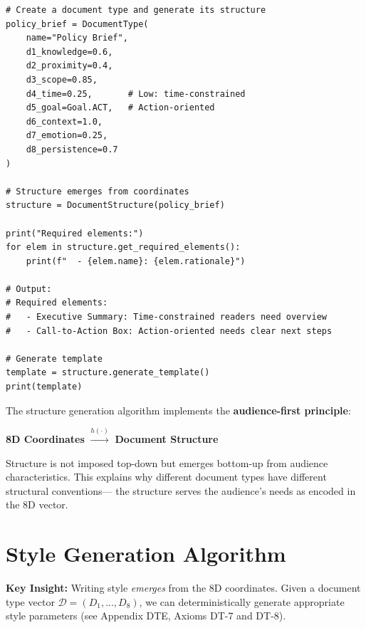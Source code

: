 \begin{verbatim}
# Create a document type and generate its structure
policy_brief = DocumentType(
    name="Policy Brief",
    d1_knowledge=0.6,
    d2_proximity=0.4,
    d3_scope=0.85,
    d4_time=0.25,       # Low: time-constrained
    d5_goal=Goal.ACT,   # Action-oriented
    d6_context=1.0,
    d7_emotion=0.25,
    d8_persistence=0.7
)

# Structure emerges from coordinates
structure = DocumentStructure(policy_brief)

print("Required elements:")
for elem in structure.get_required_elements():
    print(f"  - {elem.name}: {elem.rationale}")

# Output:
# Required elements:
#   - Executive Summary: Time-constrained readers need overview
#   - Call-to-Action Box: Action-oriented needs clear next steps

# Generate template
template = structure.generate_template()
print(template)
\end{verbatim}

\begin{tcolorbox}[colback=yellow!5!white, colframe=yellow!75!black,
    title=Key Insight: Emergent Structure]

The structure generation algorithm implements the \textbf{audience-first principle}:

\begin{center}
\textbf{8D Coordinates} $\xrightarrow{h(\cdot)}$ \textbf{Document Structure}
\end{center}

Structure is not imposed top-down but emerges bottom-up from audience characteristics.
This explains why different document types have different structural conventions---
the structure serves the audience's needs as encoded in the 8D vector.

\end{tcolorbox}


\section{Style Generation Algorithm}
\label{sec:doctype-style}

\textbf{Key Insight:} Writing style \textit{emerges} from the 8D coordinates.
Given a document type vector $\mathcal{D} = (D_1, ..., D_8)$, we can deterministically
generate appropriate style parameters (see Appendix DTE, Axioms DT-7 and DT-8).


